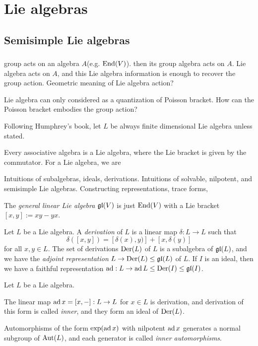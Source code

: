 \documentclass{../../large}
\begin{document}
\part{Lie algebras}
\chapter{Semisimple Lie algebras}
\section{}

group acts on an algebra $A$(e.g. $\operatorname{End}(V)$).
then its group algebra acts on $A$.
Lie algebra acts on $A$, and this Lie algebra information is enough to recover the group action.
Geometric meaning of Lie algebra action?

Lie algebra can only considered as a quantization of Poisson bracket.
How can the Poisson bracket embodies the group action?






Following Humphrey's book, let $L$ be always finite dimensional Lie algebra unless stated.

\begin{prb}
Every associative algebra is a Lie algebra, where the Lie bracket is given by the commutator.
For a Lie algebra, we are 

Intuitions of subalgebras, ideals, derivations.
Intuitions of solvable, nilpotent, and semisimple Lie algebras.
Constructing representations, trace forms,

The \emph{general linear Lie algebra} $\mathfrak{gl}(V)$ is just $\operatorname{End}(V)$ with a Lie bracket $[x,y]:=xy-yx$.
\end{prb}

\begin{prb}[Derivations]
Let $L$ be a Lie algebra.
A \emph{derivation} of $L$ is a linear map $\delta:L\to L$ such that \[\delta([x,y])=[\delta(x),y)]+[x,\delta(y)]\]
for all $x,y\in L$.
The set of derivations $\operatorname{Der}(L)$ of $L$ is a subalgebra of $\mathfrak{gl}(L)$, and we have the \emph{adjoint representation} $L\to\operatorname{Der}(L)\le\mathfrak{gl}(L)$ of $L$.
If $I$ is an ideal, then we have a faithful representation $\operatorname{ad}:L\to\operatorname{ad} L\le\operatorname{Der}(I)\le\mathfrak{gl}(I)$.
\end{prb}

\begin{prb}
Let $L$ be a Lie algebra.

The linear map $\operatorname{ad} x=[x,-]:L\to L$ for $x\in L$ is derivation, and derivation of this form is called \emph{inner}, and they form an ideal of $\operatorname{Der}(L)$.

Automorphisms of the form $\exp(\operatorname{ad} x)$ with nilpotent $\operatorname{ad} x$ generates a normal subgroup of $\operatorname{Aut}(L)$, and each generator is called \emph{inner automorphisms}.
\end{prb}
\end{document}
